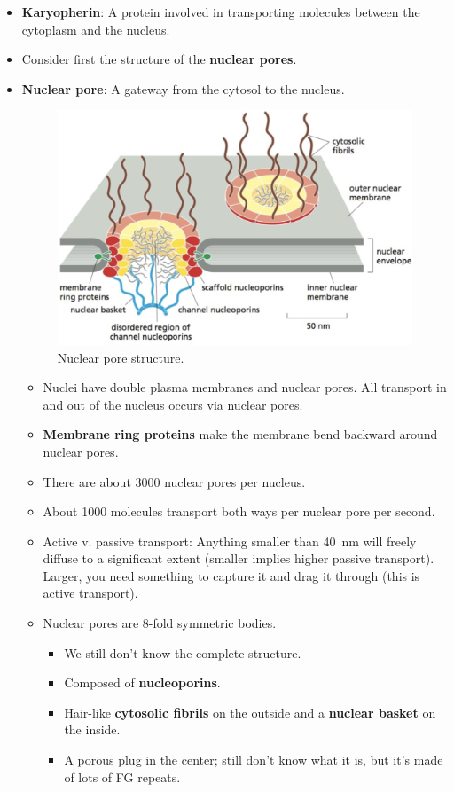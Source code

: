 \documentclass[../notes.tex]{subfiles}
\begin{document}
\begin{itemize}
\begin{itemize}
    \end{itemize}
    \item \textbf{Karyopherin}: A protein involved in transporting molecules between the cytoplasm and the nucleus.
    \item Consider first the structure of the \textbf{nuclear pores}.
    \item \textbf{Nuclear pore}: A gateway from the cytosol to the nucleus.
    \begin{figure}[h!]
        \centering
        \includegraphics[width=0.5\linewidth]{../ExtFiles/nuclearPore.png}
        \caption{Nuclear pore structure.}
        \label{fig:nuclearPore}
    \end{figure}
    \begin{itemize}
        \item Nuclei have double plasma membranes and nuclear pores. All transport in and out of the nucleus occurs via nuclear pores.
        \item \textbf{Membrane ring proteins} make the membrane bend backward around nuclear pores.
        \item There are about 3000 nuclear pores per nucleus.
        \item About 1000 molecules transport both ways per nuclear pore per second.
        \item Active v. passive transport: Anything smaller than \SI{40}{\nano\meter} will freely diffuse to a significant extent (smaller implies higher passive transport). Larger, you need something to capture it and drag it through (this is active transport).
        \item Nuclear pores are 8-fold symmetric bodies.
        \begin{itemize}
            \item We still don't know the complete structure.
            \item Composed of \textbf{nucleoporins}.
            \item Hair-like \textbf{cytosolic fibrils} on the outside and a \textbf{nuclear basket} on the inside.
            \item A porous plug in the center; still don't know what it is, but it's made of lots of FG repeats.

\end{itemize}
\end{itemize}
\end{itemize}
\end{document}
